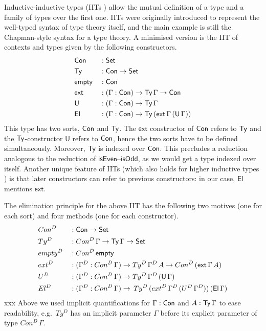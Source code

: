 \documentclass[a4paper,UKenglish,cleveref, autoref]{lipics-v2019}
\begin{document}
Inductive-inductive types (IITs \cite{forsberg-phd}) allow the mutual
definition of a type and a family of types over the first one. IITs
were originally introduced to represent the well-typed syntax of type
theory itself, and the main example is still the Chapman-style
\cite{chapman09eatitself} syntax for a type theory. A minimised version
is the IIT of contexts and types given by the following constructors.
\begin{alignat*}{5}
  & \mathsf{Con} && : \mathsf{Set} \\
  & \mathsf{Ty} && : \mathsf{Con}\rightarrow\mathsf{Set} \\
  & \mathsf{empty} && : \mathsf{Con} \\
  & \mathsf{ext} && : (\Gamma:\mathsf{Con})\rightarrow\mathsf{Ty}\,\Gamma\rightarrow\mathsf{Con} \\
  & \mathsf{U} && : (\Gamma:\mathsf{Con})\rightarrow\mathsf{Ty}\,\Gamma \\
  & \mathsf{El} && : (\Gamma:\mathsf{Con})\rightarrow\mathsf{Ty}\,(\mathsf{ext}\,\Gamma\,(\mathsf{U}\,\Gamma))
\end{alignat*}
This type has two sorts, $\mathsf{Con}$ and $\mathsf{Ty}$. The $\mathsf{ext}$ constructor of
$\mathsf{Con}$ refers to $\mathsf{Ty}$ and the $\mathsf{Ty}$-constructor $\mathsf{U}$ refers to $\mathsf{Con}$,
hence the two sorts have to be defined simultaneously. Moreover, $\mathsf{Ty}$ is
indexed over $\mathsf{Con}$. This precludes a reduction analogous to the reduction of
$\mathsf{isEven}$--$\mathsf{isOdd}$, as we would get a type indexed over
itself. Another unique feature of IITs (which also holds for higher inductive
types \cite{HoTTbook}) is that later constructors can refer to previous
constructors: in our case, $\mathsf{El}$ mentions
$\mathsf{ext}$.

The elimination principle for the above IIT has the following two
motives (one for each sort) and four methods (one for each
constructor).
\begin{alignat*}{5}
  & Con^D && : \mathsf{Con}\rightarrow\mathsf{Set} \\
  & Ty^D && : Con^D\,\Gamma\rightarrow\mathsf{Ty}\,\Gamma\rightarrow\mathsf{Set} \\
  & {empty}^D && : Con^D\,\mathsf{empty} \\
  & {ext}^D && : (\Gamma^D:Con^D\,\Gamma)\rightarrow Ty^D\,\Gamma^D\,A\rightarrow Con^D\,(\mathsf{ext}\,\Gamma\,A) \\
  & U^D && : (\Gamma^D:Con^D\,\Gamma)\rightarrow Ty^D\,\Gamma^D\,(\mathsf{U}\,\Gamma) \\
  & El^D && : (\Gamma^D:Con^D\,\Gamma)\rightarrow\,Ty^D\,({ext}^D\,\Gamma^D\,(U^D\,\Gamma^D))\,(\mathsf{El}\,\Gamma)
\end{alignat*} xxx
Above we used implicit quantifications for $\Gamma:\mathsf{Con}$ and
$A:\mathsf{Ty}\,\Gamma$ to ease readability, e.g.\ $Ty^D$ has an implicit
parameter $\Gamma$ before its explicit parameter of type
$Con^D\,\Gamma$.
\end{document}
